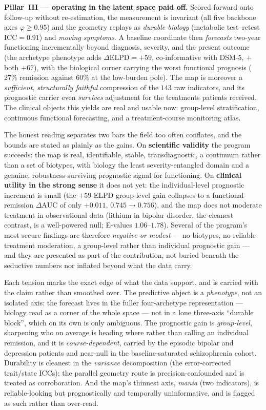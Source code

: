 \textbf{Pillar~III --- operating in the latent space paid off.} Scored forward onto follow-up without
re-estimation, the measurement is invariant (all five backbone axes $\varphi\ge0.95$) and the geometry replays
as \emph{durable biology} (metabolic test--retest $\text{ICC}=0.91$) and \emph{moving symptoms}. A baseline
coordinate then \emph{forecasts} two-year functioning incrementally beyond diagnosis, severity, and the present
outcome (the archetype phenotype adds $\Delta\text{ELPD}=+59$, co-informative with DSM-5, $+$both $+67$), with
the biological corner carrying the worst functional prognosis ($27\%$ remission against $60\%$ at the low-burden
pole). The map is moreover a \emph{sufficient, structurally faithful} compression of the $143$ raw indicators,
and its prognostic carrier even \emph{survives} adjustment for the treatments patients received. The clinical
objects this yields are real and usable now: group-level stratification, continuous functional forecasting, and
a treatment-course monitoring atlas.

The honest reading separates two bars the field too often conflates, and the bounds are stated as plainly as the
gains. On \textbf{scientific validity} the program succeeds: the map is real, identifiable, stable,
transdiagnostic, a continuum rather than a set of biotypes, with biology the least severity-entangled domain and
a genuine, robustness-surviving prognostic signal for functioning. On \textbf{clinical utility in the strong
sense} it does not yet: the individual-level prognostic increment is small (the $+59$-ELPD group-level gain
collapses to a functional-remission $\Delta\text{AUC}$ of only $+0.011$, $0.745\to0.756$), and the map does not
moderate treatment in observational data (lithium in bipolar disorder, the cleanest contrast, is a well-powered
null; E-values $1.06$--$1.78$). Several of the program's most secure findings are therefore \emph{negative or
modest} --- no biotypes, no reliable treatment moderation, a group-level rather than individual prognostic gain
--- and they are presented as part of the contribution, not buried beneath the seductive numbers nor inflated
beyond what the data carry.

Each tension marks the exact edge of what the data support, and is carried with the claim rather than smoothed
over. The predictive object is a \emph{phenotype}, not an isolated axis: the forecast lives in the fuller
four-archetype representation --- biology read as a corner of the whole space --- not in a lone three-axis
``durable block'', which on its own is only ambiguous. The prognostic gain is \emph{group-level}, sharpening who
on average is heading where rather than calling an individual remission, and it is \emph{course-dependent},
carried by the episodic bipolar and depression patients and near-null in the baseline-saturated schizophrenia
cohort. Durability is cleanest in the \emph{variance} decomposition (the error-corrected trait/state ICCs); the
parallel geometry route is precision-confounded and is treated as corroboration. And the map's thinnest axis,
\emph{mania} (two indicators), is reliable-looking but prognostically and temporally uninformative, and is
flagged as such rather than over-read.

